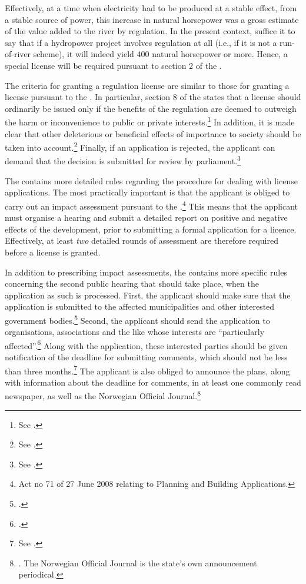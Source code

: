Effectively, at a time when electricity had to be produced at a stable effect, from a stable source of power, this increase in natural horsepower was a gross estimate of the value added to the river by regulation. In the present context, suffice it to say that if a hydropower project involves regulation at all (i.e., if it is not a run-of-river scheme), it will indeed yield 400 natural horsepower or more. Hence, a special license will be required pursuant to section 2 of the \cite{wra17}. 

The criteria for granting a regulation license are similar to those for granting a license pursuant to the \cite{wra00}. In particular, section 8 of the \cite{wra17} states that a license should ordinarily be issued only if the benefits of the regulation are deemed to outweigh the harm or inconvenience to public or private interests.\footnote{See \cite[8]{wra17}.} In addition, it is made clear that other deleterious or beneficial effects of importance to society should be taken into account.\footnote{See \cite[8]{wra17}.} Finally, if an application is rejected, the applicant can demand that the decision is submitted for review by parliament.\footnote{See \cite[8]{wra17}.}

The \cite{wra17} contains more detailed rules regarding the procedure for dealing with license applications. The most practically important is that the applicant is obliged to carry out an impact assessment pursuant to the \cite{pb08}.\footnote{Act no 71 of 27 June 2008 relating to Planning and Building Applications.} This means that the applicant must organise a hearing and submit a detailed report on positive and negative effects of the development, prior to submitting a formal application for a licence. Effectively, at least {\it two} detailed rounds of assessment are therefore required before a license is granted.

In addition to prescribing impact assessments, the \cite{wra17} contains more specific rules concerning the second public hearing that should take place, when the application as such is processed. First, the applicant should make sure that the application is submitted to the affected municipalities and other interested government bodies.\footcite[6]{wra17} Second, the applicant should send the application to organisations, associations and the like whose interests are ``particularly affected''.\footcite[6]{wra17} Along with the application, these interested parties should be given notification of the deadline for submitting comments, which should not be less than three months.\footnote{See \cite[6]{wra17}.} The applicant is also obliged to announce the plans, along with information about the deadline for comments, in at least one commonly read newspaper, as well as the Norwegian Official Journal.\footnote{\cite[6]{wra17}. The Norwegian Official Journal is the state's own announcement periodical.}

